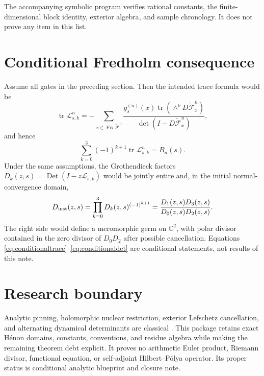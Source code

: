 \documentclass[11pt]{article}
\newcommand{\C}{\mathbb C}
\newcommand{\Fix}{\operatorname{Fix}}
\newcommand{\tr}{\operatorname{tr}}
\newcommand{\Det}{\operatorname{Det}}
\begin{document}
The accompanying symbolic program verifies rational constants, the
finite-dimensional block identity, exterior algebra, and sample chronology.
It does not prove any item in this list.

\section{Conditional Fredholm consequence}

Assume all gates in the preceding section.  Then the intended trace formula
would be
\begin{equation}\label{eq:conditionaltrace}
 \tr\mathcal L_{s,k}^n
 =-\sum_{x\in\Fix\widetilde{\mathcal F}^n}
 \frac{g_s^{(n)}(x)\tr(\wedge^kD\widetilde{\mathcal F}^n_x)}
 {\det(I-D\widetilde{\mathcal F}^n_x)},
\end{equation}
and hence
\[
 \sum_{k=0}^3(-1)^{k+1}\tr\mathcal L_{s,k}^n=B_n(s).
\]
Under the same assumptions, the Grothendieck factors
$D_k(z,s)=\Det(I-z\mathcal L_{s,k})$ would be jointly entire and, in the
initial normal-convergence domain,
\begin{equation}\label{eq:conditionaldet}
 D_{\rm inst}(z,s)
 =\prod_{k=0}^3D_k(z,s)^{(-1)^{k+1}}
 =\frac{D_1(z,s)D_3(z,s)}{D_0(z,s)D_2(z,s)}.
\end{equation}
The right side would define a meromorphic germ on $\C^2$, with polar divisor
contained in the zero divisor of $D_0D_2$ after possible cancellation.
Equations \eqref{eq:conditionaltrace}--\eqref{eq:conditionaldet} are
conditional statements, not results of this note.

\section{Research boundary}

Analytic pinning, holomorphic nuclear restriction, exterior Lefschetz
cancellation, and alternating dynamical determinants are classical
\cite{Ruelle1976,Ruelle1990,Rugh1996,BPS2003}.  This package retains exact
H\'enon domains, constants, conventions, and residue algebra while making the
remaining theorem debt explicit.  It proves no arithmetic Euler product,
Riemann divisor, functional equation, or self-adjoint Hilbert--P\'olya
operator.  Its proper status is conditional analytic blueprint and closure
note.



\end{document}
